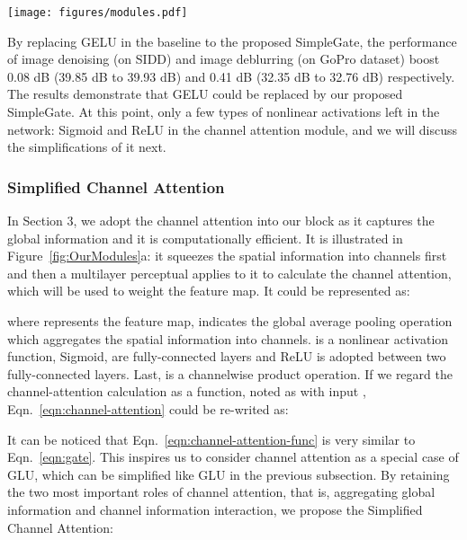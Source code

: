 \documentclass[runningheads]{llncs}
\begin{document}
\begin{figure*}[!t]
\texttt{[image: figures/modules.pdf]}
\caption{ Illustration of (a) Channel Attention\cite{hu2018squeeze} (CA), (b) Simplified Channel Attention (SCA), and (c) Simple Gate (SG). /: element-wise/channel-wise multiplication
}
\label{fig:OurModules}
\end{figure*}

By replacing GELU in the baseline to the proposed SimpleGate, the performance of image denoising (on SIDD\cite{SIDD_2018_CVPR}) and image deblurring (on GoPro\cite{nah2017deep} dataset) boost 0.08 dB (39.85 dB to 39.93 dB) and 0.41 dB (32.35 dB to 32.76 dB) respectively. The results demonstrate that GELU could be replaced by our proposed SimpleGate. At this point, only a few types of nonlinear activations left in the network: Sigmoid and ReLU in the channel attention module\cite{hu2018squeeze}, and we will discuss the simplifications of it next.


\subsubsection{Simplified Channel Attention}
In Section 3, we adopt the channel attention\cite{hu2018squeeze} into our block as it captures the global information and it is computationally efficient. It is illustrated in Figure~\ref{fig:OurModules}a: it squeezes the spatial information into channels first and then a multilayer perceptual applies to it to calculate the channel attention, which will be used to weight the feature map. It could be represented as:
 
where  represents the feature map,  indicates the global average pooling operation which aggregates the spatial information into channels.  is a nonlinear activation function, Sigmoid,  are fully-connected layers and ReLU is adopted between two fully-connected layers. Last,  is a channelwise product operation. If we regard the channel-attention calculation as a function, noted as  with input  , Eqn.~\ref{eqn:channel-attention} could be re-writed as:

It can be noticed that Eqn.~\ref{eqn:channel-attention-func} is very similar to Eqn.~\ref{eqn:gate}. 
This inspires us to consider channel attention as a special case of GLU, which can be simplified like GLU in the previous subsection.
By retaining the two most important roles of channel attention, that is, aggregating global information and channel information interaction, we propose the Simplified Channel Attention:
\end{document}
